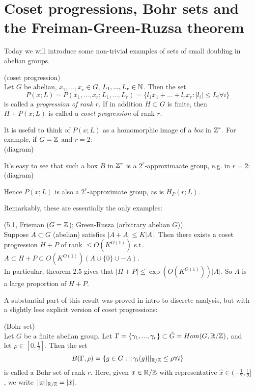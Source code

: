 \documentclass[a4paper]{article}
\begin{document}
\newpage

\section{Coset progressions, Bohr sets and the Freiman-Green-Ruzsa theorem}
Today we will introduce some non-trivial examples of sets of small doubling in abelian groups.

\begin{defi} (coset progression)\\
Let $G$ be abelian, $x_1,...,x_r \in G$, $L_1,...,L_r \in \mathbb{N}$. Then the set
\[
P(x;L) = P(x_1,...,x_r;L_1,...,L_r) = \{l_1x_1+...+l_rx_r : |l_i| \leq L_i  \forall i\}
\]
is called a \emph{progression of rank $r$}. If in addition $H \subset G$ is finite, then $H+P(x;L)$ is called a \emph{coset progression} of rank $r$.
\end{defi}

It is useful to think of $P(x;L)$ as a homomorphic image of a \emph{box} in $\mathbb{Z}^r$. For example, if $G=\mathbb{Z}$ and $r=2$:\\
(diagram)

It's easy to see that such a box $B$ in $\mathbb{Z}^r$ is a $2^r$-approximaate group, e.g. in $r=2$:\\
(diagram)

Hence $P(x;L)$ is also a $2^r$-approximate group, as is $H_P(r;L)$.

Remarkably, these are essentially the only examples:

\begin{thm} (5.1, Frieman ($G=\mathbb{Z}$); Green-Rusza (arbitrary abelian $G$))\\
Suppose $A \subset G$ (abelian) satisfies $|A+A| \leq K|A|$. Then there exists a coset progression $H+P$ of rank $\leq O(K^{O(1)})$ s.t. $A \subset H+P \subset O(K^{O(1)})(A \cup \{0\} \cup -A)$.\\
In particular, theorem 2.5 gives that $|H+P| \leq \exp(O(K^{O(1)})) |A|$. So $A$ is a large proportion of $H+P$.
\end{thm}

A substantial part of this result was proved in intro to discrete analysis, but with a slightly less explicit version of coset progressions:

\begin{defi} (Bohr set)\\
Let $G$ be a finite abelian group. Let $\Gamma = \{\gamma_1,...,\gamma_r\} \subset \hat{G} = Hom(G,\mathbb{R}/\mathbb{Z})$, and let $\rho \in [0,\frac{1}{2}]$. Then the set
\[
B(\Gamma,\rho) = \{g \in G: || \gamma_i(g)||_{\mathbb{R}/\mathbb{Z}} \leq \rho \forall i \}
\]
is called a Bohr set of rank $r$. Here, given $x \in \mathbb{R}/\mathbb{Z}$ with representative $\hat{x} \in (-\frac{1}{2},\frac{1}{2}]$, we write $||x||_{\mathbb{R}/\mathbb{Z}} = |\hat{x}|$.
\end{defi}
\end{document}
